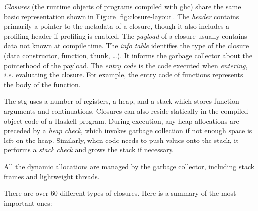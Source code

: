 \documentclass[thesis=B,english]{FITthesis}[2019/12/23]
\newcommand{\ie}{\emph{i.e.}\xspace}
\begin{document}
\textit{Closures} (the runtime objects of programs compiled with
\acrshort{ghc}) share the same basic representation shown in Figure
\ref{fig:closure-layout}. The \textit{header} contains primarily a pointer to
the metadata of a closure, though it also includes a profiling header if
profiling is enabled. The \textit{payload} of a closure usually contains data
not known at compile time. The \textit{info table} identifies the type of the
closure (data constructor, function, thunk, \ldots). It informs the garbage
collector about the pointer\-hood of the payload. The \textit{entry code} is
the code executed when \textit{entering}, \ie evaluating the closure. For
example, the entry code of functions represents the body of the function.

The \acrshort{stg} uses a number of registers, a heap, and a stack which stores
function arguments and continuations. Closures can also reside statically in
the compiled object code of a Haskell program. During execution, any heap
allocations are preceded by a \textit{heap check}, which invokes garbage
collection if not enough space is left on the heap. Similarly, when code needs
to push values onto the stack, it performs a \textit{stack check} and grows the
stack if necessary.

All the dynamic allocations are managed by the garbage collector, including
stack frames and lightweight threads.

There are over 60 different types of closures. Here is a summary of the most
important ones:
\end{document}
